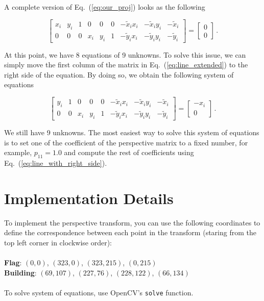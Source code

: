 \documentclass[12pt]{article}
\begin{document}
A complete version of Eq.~(\ref{eq:our_proj}) looks as the following

\begin{equation}
    \label{eq:line_extended}
    \begin{bmatrix}
        x_i & y_i & 1 & 0   & 0   & 0 & -\tilde{x}_i x_i & -\tilde{x}_i y_i & -\tilde{x}_i \\
        0   & 0   & 0 & x_i & y_i & 1 & -\tilde{y}_i x_i & -\tilde{y}_i y_i & -\tilde{y}_i
    \end{bmatrix}
    =
    \begin{bmatrix}
        0 \\
        0
    \end{bmatrix}
    \, .
\end{equation}

At this point, we have 8 equations of 9 unknowns.
To solve this issue, we can simply move the first column of the matrix in Eq.~(\ref{eq:line_extended}) to the right side of the equation.
By doing so, we obtain the following system of equations

\begin{equation}
    \label{eq:line_with_right_side}
    \begin{bmatrix}
        y_i & 1 & 0   & 0   & 0 & -\tilde{x}_i x_i & -\tilde{x}_i y_i & -\tilde{x}_i \\
        0   & 0 & x_i & y_i & 1 & -\tilde{y}_i x_i & -\tilde{y}_i y_i & -\tilde{y}_i
    \end{bmatrix}
    =
    \begin{bmatrix}
        -x_i \\
        0
    \end{bmatrix}
    \, .
\end{equation}

We still have 9 unknowns.
The most easiest way to solve this system of equations is to set one of the coefficient of the perspective matrix to a fixed number, for example, $p_{11} = 1.0$
and compute the rest of coefficients using Eq.~(\ref{eq:line_with_right_side}).

\section*{Implementation Details}

To implement the perspective transform, you can use the following coordinates to define the correspondence between each point in the transform (staring from the top left corner in clockwise order):
\\
\\
\noindent
\textbf{Flag}: $(0, 0)$, $(323, 0)$, $(323, 215)$, $(0, 215)$\\
\textbf{Building}: $(69, 107)$, $(227, 76)$, $(228, 122)$, $(66, 134)$
\\
\\
\noindent
To solve system of equations, use OpenCV's \texttt{solve} function.
\end{document}
